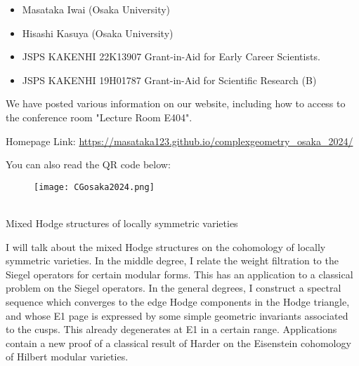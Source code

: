 \documentclass[dvipdfmx,a4paper,12pt]{article}
\theoremstyle{plain} %
\theoremstyle{definition} %
\begin{document}
\vskip10mm
\begin{itemize}
  \setlength{\parskip}{0cm} 
  \setlength{\itemsep}{0cm}
\item Masataka Iwai (Osaka University)
\item Hisashi Kasuya (Osaka University)
  \end{itemize}
  
\begin{itemize}
  \setlength{\parskip}{0cm} 
  \setlength{\itemsep}{0cm}
\item JSPS KAKENHI 22K13907 Grant-in-Aid for Early Career Scientists.
\item JSPS KAKENHI 19H01787 Grant-in-Aid for Scientific Research (B)
  \end{itemize}


We have posted various information on our website, including how to access to the conference room "Lecture Room E404".

\vskip3mm
Homepage Link: \url{https://masataka123.github.io/complexgeometry_osaka_2024/}

You can also read the QR code below:

\begin{figure}[htbp]
\begin{center}
 \texttt{[image: CGosaka2024.png]}
\end{center}
\end{figure}



\newpage

\vskip5mm

\vskip3mm

\\
Mixed Hodge structures of locally symmetric varieties

\vskip3mm
I will talk about the mixed Hodge structures on the cohomology of locally symmetric varieties. 
In the middle degree, I relate the weight filtration to the Siegel operators for certain modular forms. This has an application to a classical problem on the Siegel operators. 
In the general degrees, I construct a spectral sequence which converges to the edge Hodge components in the Hodge triangle, and whose E1 page is expressed by some simple geometric invariants associated to the cusps. 
This already degenerates at E1 in a certain range. Applications contain a new proof of a classical result of Harder on the Eisenstein cohomology of Hilbert modular varieties. 
\vskip6mm
\end{document}

